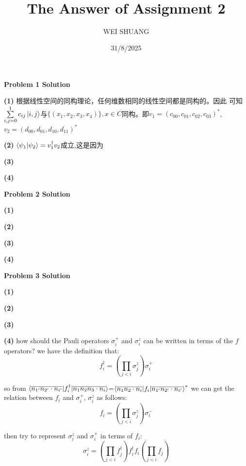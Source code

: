 \documentclass[12pt]{article}
\title{The Answer of Assignment 2}
\author{WEI SHUANG}
\date{31/8/2025}
\begin{document}
\maketitle

\begin{center}
    \textbf{Problem 1 Solution}
\end{center}

\textbf{(1)}
根据线性空间的同构理论，任何维数相同的线性空间都是同构的。因此  
可知$\sum\limits_{i,j=0}^{1}c_{ij}\ket{i,j}$与$\{(x_1,x_2,x_3,x_4)\},x\in C$同构。即$v_1=(c_{00},c_{01},c_{02},c_{03})^*$,$v_2=(d_{00},d_{01},d_{10},d_{11})^*$




\textbf{(2)}
$\braket{\psi_1|\psi_2}=v_1^\dagger v_2$成立,这是因为

\textbf{(3)}

\textbf{(4)}
\begin{center}
    \textbf{Problem 2 Solution}
\end{center}

\textbf{(1)}

\textbf{(2)}

\textbf{(3)}

\textbf{(4)}

\begin{center}
    \textbf{Problem 3 Solution}
\end{center}

\textbf{(1)}

\textbf{(2)}

\textbf{(3)}

\textbf{(4)}
how should the Pauli operators $\sigma_i^+ $ and $\sigma_i^z $ can be written in terms of the  $f$ operators? 
we have the definition that:\[
f_i^\dagger = \left( \prod_{j<i} \sigma_j^z \right) \sigma_i^+
\]

so from $\braket{\overline{n_{1'}n_{2'}\cdot n_{i'}}|f_i^\dagger|\overline{n_1n_2n_3\cdot n_i}}$=$\braket{\overline{n_{1}n_{2}\cdot n_{i}}|f_i|\overline{n_{1'}n_{2'}\cdot n_{i'}}}^*$
we can get the relation between $f_i$ and $\sigma_i^+$, $\sigma_i^z$ as follows:
\[
f_i = \left( \prod_{j<i} \sigma_j^z \right) \sigma_i^-
\]

then try to represent $\sigma_i^z$ and $\sigma_i^+$ in terms of $f_i$:
\[
\sigma_i^z = \left( \prod_{j<i} f_j^\dagger \right) f_i^\dagger f_i \left( \prod_{j<i} f_j \right)
\]
\end{document}

